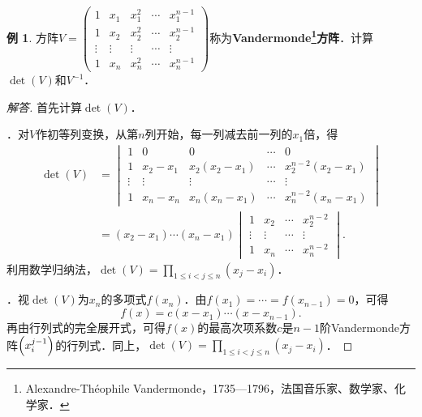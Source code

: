 \documentclass[a4paper,fontset=windows]{ctexbook}
\theoremstyle{definition}
\newtheorem{example}{例}[chapter]
\renewcommand{\le}{\leqslant}
\begin{document}
\begin{example}\label{ex3.8}
方阵$V=\begin{pmatrix}1&x_1&x_1^2&\cdots&x_1^{n-1} \\ 1&x_2&x_2^2&\cdots&x_2^{n-1} \\ \vdots&\vdots&\vdots&\cdots&\vdots \\ 1&x_n&x_n^2&\cdots&x_n^{n-1}\end{pmatrix}$称为{\bf Vandermonde\footnote{Alexandre-Th\'eophile Vandermonde，1735—1796，法国音乐家、数学家、化学家．}方阵}．计算$\det(V)$和$V^{-1}$．
\end{example}

\begin{proof}[解答]
首先计算$\det(V)$．

．对$V$作初等列变换，从第$n$列开始，每一列减去前一列的$x_1$倍，得
\begin{align*}
\det(V)&=\begin{vmatrix}1&0&0&\cdots&0 \\ 1&x_2-x_1&x_2(x_2-x_1)&\cdots&x_2^{n-2}(x_2-x_1) \\ \vdots&\vdots&\vdots&\cdots&\vdots \\ 1&x_n-x_n&x_n(x_n-x_1)&\cdots&x_n^{n-2}(x_n-x_1)\end{vmatrix} \\
&=(x_2-x_1)\cdots(x_n-x_1)\begin{vmatrix}1&x_2&\cdots&x_2^{n-2} \\ \vdots&\vdots&\cdots&\vdots \\ 1&x_n&\cdots&x_n^{n-2}\end{vmatrix}.
\end{align*}
利用数学归纳法，$\det(V)=\prod\limits_{1\le i<j\le n}(x_j-x_i)$．

．视$\det(V)$为$x_n$的多项式$f(x_n)$．由$f(x_1)=\cdots=f(x_{n-1})=0$，可得
$$f(x)=c(x-x_1)\cdots(x-x_{n-1}).$$
再由行列式的完全展开式，可得$f(x)$的最高次项系数$c$是$n-1$阶Vandermonde方阵$\Bigl(x_i^{j-1}\Bigr)$的行列式．同上，$\det(V)=\prod\limits_{1\le i<j\le n}(x_j-x_i)$．


\end{proof}
\end{document}
